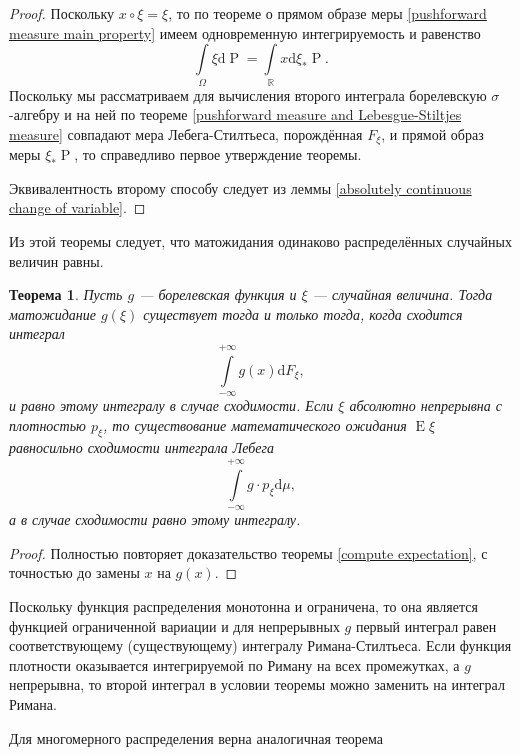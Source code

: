 \documentclass[12pt]{article}
\newtheorem{theorem}{Теорема}
\numberwithin{theorem}{section}
\theoremstyle{definition}
\newcommand{\RR}{\mathbb{R}}
\newcommand{\prob}{\operatorname{P}}
\newcommand{\expect}{\operatorname{E}}
\newcommand{\diff}{\mathrm{d}}
\begin{document}
	\begin{proof}
		Поскольку $ x \circ \xi = \xi $, то по теореме о прямом образе меры \ref{pushforward measure main property} 
		имеем одновременную интегрируемость и равенство
		$$ \int\limits_{\Omega} \xi \diff\prob = \int\limits_{\RR} x \diff \xi_*\prob. $$
		Поскольку мы рассматриваем для вычисления второго интеграла борелевскую $ \sigma $-алгебру
		и на ней по теореме \ref{pushforward measure and Lebesgue-Stiltjes measure} совпадают мера Лебега-Стилтьеса,
		порождённая $ F_\xi $, и прямой образ меры $ \xi_*\prob $, то справедливо первое утверждение теоремы.
		
		Эквивалентность второму способу следует из леммы \ref{absolutely continuous change of variable}.
	\end{proof}
	
	Из этой теоремы следует, что матожидания одинаково распределённых случайных величин равны.
	
	\begin{theorem} \label{compute expectation of composition}
		Пусть $ g $ --- борелевская функция и $ \xi $ --- случайная величина.
		Тогда матожидание $ g(\xi) $ существует тогда и только тогда,
		когда сходится интеграл
		$$ \int\limits_{-\infty}^{+\infty} g(x)\diff F_{\xi}, $$
		и равно этому интегралу в случае сходимости.
		Если $ \xi $ абсолютно непрерывна с плотностью $ p_\xi $,
		то существование математического ожидания $ \expect\xi $ равносильно сходимости интеграла Лебега
		$$ \int\limits_{-\infty}^{+\infty} g\cdot p_\xi\diff \mu, $$
		а в случае сходимости равно этому интегралу.
	\end{theorem}
	
	\begin{proof}
		Полностью повторяет доказательство теоремы \ref{compute expectation}, с точностью до замены $ x $ на $ g(x) $.
	\end{proof}
	
	Поскольку функция распределения монотонна и ограничена, то она является функцией ограниченной вариации и для непрерывных $ g $
	первый интеграл равен соответствующему (существующему) интегралу Римана-Стилтьеса. Если функция плотности оказывается интегрируемой по Риману на всех промежутках, а $ g $ непрерывна, то второй интеграл в условии теоремы можно заменить на интеграл Римана.
	
	Для многомерного распределения верна аналогичная теорема
	
\end{document}
